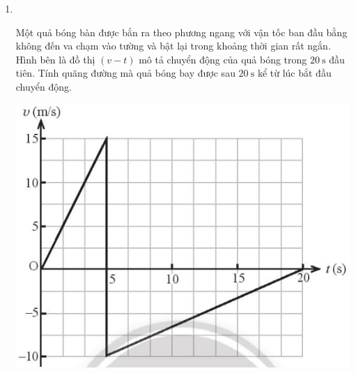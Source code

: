 \begin{enumerate}[label=\bfseries Bài \arabic*:,leftmargin=1.5cm]
\item {}\\
{Một quả bóng bàn được bắn ra theo phương ngang với vận tốc ban đầu bằng không đến va chạm vào tường và bật lại trong khoảng thời gian rất ngắn. Hình bên là đồ thị $\left(v-t\right)$ mô tả chuyển động của quả bóng trong $\SI{20}{\second}$ đầu tiên. Tính quãng đường mà quả bóng bay được sau $\SI{20}{\second}$ kể từ lúc bắt đầu chuyển động.
	\begin{center}
		\includegraphics[width=0.4\linewidth]{../figs/VN10-2022-PH-TP008-P-10}
	\end{center}

}
\end{enumerate}